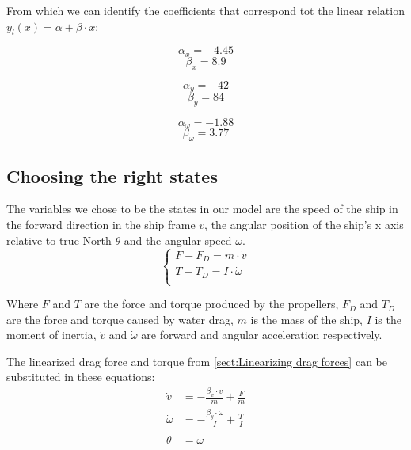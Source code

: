 From which we can identify the coefficients that correspond tot the linear relation $ y_{l}(x) = \alpha + \beta \cdot x $:\\
\begin{minipage}{0.3\linewidth}
\[ \alpha_{x} = -4.45 \] 
\[ \beta_{x} = 8.9 \]
\end{minipage}
\begin{minipage}{0.3\linewidth}
\[ \alpha_{y} = -42 \] 
\[ \beta_{y} = 84 \]
\end{minipage}
\begin{minipage}{0.3\linewidth}
\[ \alpha_{\omega} = -1.88 \]
\[ \beta_{\omega} = 3.77 \]
\end{minipage}


\subsection{Choosing the right states}

The variables we chose to be the states in our model are the speed of the ship in the forward direction in the ship frame $v$, the angular position of the ship's x axis relative to true North $\theta$ and the angular speed $\omega$.\\
\[\begin{cases}
F - F_{D} = m \cdot \dot{v}\\
T - T_{D} = I \cdot \dot{\omega}\\
\end{cases}\]

Where $ F $ and $ T $ are the force and torque produced by the propellers, $ F_{D} $ and $ T_{D} $ are the force and torque caused by water drag, $ m $ is the mass of the ship, $ I $ is the moment of inertia, $ \dot{v} $  and $ \dot{\omega} $ are forward and angular acceleration respectively.

The linearized drag force and torque from \ref{sect:Linearizing drag forces} can be substituted in these equations:
\begin{align}
 \dot{v} &= - \frac{\beta_{x} \cdot v}{m} + \frac{F}{m}\\
 \dot{\omega} &= - \frac{\beta_{y} \cdot \omega}{I} + \frac{T}{I}\\
 \dot{\theta} &= \omega
\end{align}


